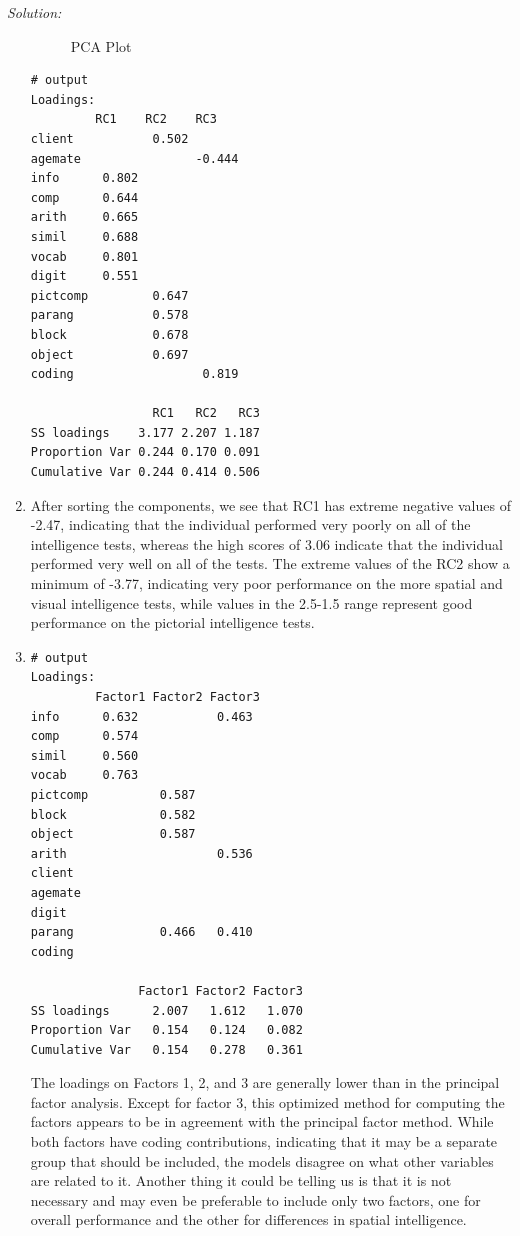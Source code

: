 \documentclass{article}
\newenvironment{solution}
    {\textit{Solution:}}
    {}
\begin{document}
\begin{solution}
\begin{enumerate}
\begin{figure}[h]
		\caption{PCA Plot}
	\end{figure}
	\begin{lstlisting}
# output
Loadings:
         RC1    RC2    RC3   
client           0.502       
agemate                -0.444
info      0.802              
comp      0.644              
arith     0.665              
simil     0.688              
vocab     0.801              
digit     0.551              
pictcomp         0.647       
parang           0.578       
block            0.678       
object           0.697       
coding                  0.819

                 RC1   RC2   RC3
SS loadings    3.177 2.207 1.187
Proportion Var 0.244 0.170 0.091
Cumulative Var 0.244 0.414 0.506
	\end{lstlisting}
\item\mbox{}
After sorting the components, we see that RC1 has extreme negative values of -2.47, indicating that the individual performed very poorly on all of the intelligence tests, whereas the high scores of 3.06 indicate that the individual performed very well on all of the tests. The extreme values of the RC2 show a minimum of -3.77, indicating very poor performance on the more spatial and visual intelligence tests, while values in the 2.5-1.5 range represent good performance on the pictorial intelligence tests.
\item\mbox{}
	\begin{lstlisting}
# output
Loadings:
         Factor1 Factor2 Factor3
info      0.632           0.463 
comp      0.574                 
simil     0.560                 
vocab     0.763                 
pictcomp          0.587         
block             0.582         
object            0.587         
arith                     0.536 
client                          
agemate                         
digit                           
parang            0.466   0.410 
coding                          

               Factor1 Factor2 Factor3
SS loadings      2.007   1.612   1.070
Proportion Var   0.154   0.124   0.082
Cumulative Var   0.154   0.278   0.361
	\end{lstlisting}
The loadings on Factors 1, 2, and 3 are generally lower than in the principal factor analysis. Except for factor 3, this optimized method for computing the factors appears to be in agreement with the principal factor method. While both factors have coding contributions, indicating that it may be a separate group that should be included, the models disagree on what other variables are related to it. Another thing it could be telling us is that it is not necessary and may even be preferable to include only two factors, one for overall performance and the other for differences in spatial intelligence.
\end{enumerate}
\end{solution}
\end{document}
